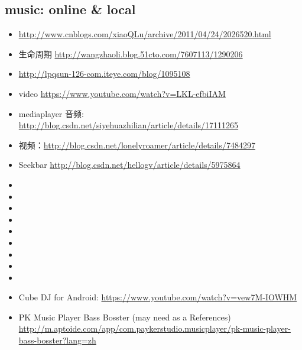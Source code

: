 \documentclass[9pt,b5paper]{article}
\begin{document}
\subsection{music: online \& local}
\label{sec-2-1}
\begin{itemize}
\item \url{http://www.cnblogs.com/xiaoQLu/archive/2011/04/24/2026520.html}
\item 生命周期 \url{http://wangzhaoli.blog.51cto.com/7607113/1290206}
\item \url{http://lpqsun-126-com.iteye.com/blog/1095108}
\item video \url{https://www.youtube.com/watch?v=LKL-efbiIAM}
\item mediaplayer 音频: \url{http://blog.csdn.net/siyehuazhilian/article/details/17111265}
\item 视频：\url{http://blog.csdn.net/lonelyroamer/article/details/7484297}
\item Seekbar \url{http://blog.csdn.net/hellogv/article/details/5975864}
\item 
\item 
\item 
\item 
\item 
\item 
\item 
\item 
\item 
\item Cube DJ for Android: \url{https://www.youtube.com/watch?v=vew7M-IOWHM}
\item PK Music Player Bass Bosster (may need as a References) \url{http://m.aptoide.com/app/com.paykerstudio.musicplayer/pk-music-player-bass-bosster?lang=zh}
\end{itemize}
\end{document}
